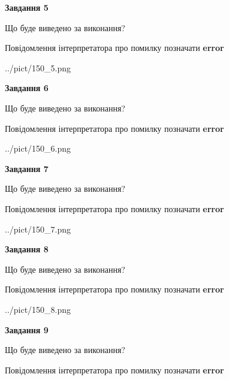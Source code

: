 \documentclass[11pt, ukrainian]{article}
\begin{document}
{\begin {large}
{\begin {center}\textbf{Завдання 5}\end {center}}\par
Що буде виведено за виконання? \par
Повідомлення інтерпретатора про помилку позначати \textbf{error}

\begin{center}
	{../pict/150_5.png}
\end{center}
\newpage

{\begin {center}\textbf{Завдання 6}\end {center}}\par
Що буде виведено за виконання? \par
Повідомлення інтерпретатора про помилку позначати \textbf{error}

\begin{center}
	{../pict/150_6.png}
\end{center}
\newpage

{\begin {center}\textbf{Завдання 7}\end {center}}\par
Що буде виведено за виконання? \par
Повідомлення інтерпретатора про помилку позначати \textbf{error}

\begin{center}
	{../pict/150_7.png}
\end{center}
\newpage

{\begin {center}\textbf{Завдання 8}\end {center}}\par
Що буде виведено за виконання? \par
Повідомлення інтерпретатора про помилку позначати \textbf{error}

\begin{center}
	{../pict/150_8.png}
\end{center}
\newpage

{\begin {center}\textbf{Завдання 9}\end {center}}\par
Що буде виведено за виконання? \par
Повідомлення інтерпретатора про помилку позначати \textbf{error}


\end{large}}
\end{document}

